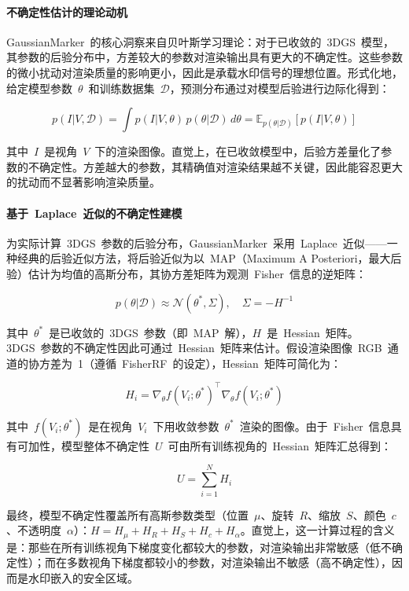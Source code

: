\paragraph{不确定性估计的理论动机}
GaussianMarker~的核心洞察来自贝叶斯学习理论：对于已收敛的~3DGS~模型，其参数的后验分布中，方差较大的参数对渲染输出具有更大的不确定性。这些参数的微小扰动对渲染质量的影响更小，因此是承载水印信号的理想位置。形式化地，给定模型参数~$\theta$~和训练数据集~$\mathcal{D}$，预测分布通过对模型后验进行边际化得到：

\begin{equation}
  p(I|V, \mathcal{D}) = \int p(I|V, \theta) \, p(\theta|\mathcal{D}) \, d\theta = \mathbb{E}_{p(\theta|\mathcal{D})}[p(I|V, \theta)]
\end{equation}

其中~$I$~是视角~$V$~下的渲染图像。直觉上，在已收敛模型中，后验方差量化了参数的不确定性。方差越大的参数，其精确值对渲染结果越不关键，因此能容忍更大的扰动而不显著影响渲染质量。

\paragraph{基于~Laplace~近似的不确定性建模}
为实际计算~3DGS~参数的后验分布，GaussianMarker~采用~Laplace~近似——一种经典的后验近似方法，将后验近似为以~MAP（Maximum A Posteriori，最大后验）估计为均值的高斯分布，其协方差矩阵为观测~Fisher~信息的逆矩阵：

\begin{equation}
  p(\theta|\mathcal{D}) \approx \mathcal{N}(\theta^*, \Sigma), \quad \Sigma = -H^{-1}
\end{equation}

其中~$\theta^*$~是已收敛的~3DGS~参数（即~MAP~解），$H$~是~Hessian~矩阵。3DGS~参数的不确定性因此可通过~Hessian~矩阵来估计。假设渲染图像~RGB~通道的协方差为~1（遵循~FisherRF~的设定），Hessian~矩阵可简化为：

\begin{equation}
  H_i = \nabla_\theta f(V_i; \theta^*)^\top \nabla_\theta f(V_i; \theta^*)
\end{equation}

其中~$f(V_i; \theta^*)$~是在视角~$V_i$~下用收敛参数~$\theta^*$~渲染的图像。由于~Fisher~信息具有可加性，模型整体不确定性~$U$~可由所有训练视角的~Hessian~矩阵汇总得到：

\begin{equation}
  U = \sum_{i=1}^{N} H_i
\end{equation}

最终，模型不确定性覆盖所有高斯参数类型（位置~$\mu$、旋转~$R$、缩放~$S$、颜色~$c$、不透明度~$\alpha$）：$H = H_\mu + H_R + H_S + H_c + H_\alpha$。直觉上，这一计算过程的含义是：那些在所有训练视角下梯度变化都较大的参数，对渲染输出非常敏感（低不确定性）；而在多数视角下梯度都较小的参数，对渲染输出不敏感（高不确定性），因而是水印嵌入的安全区域。

